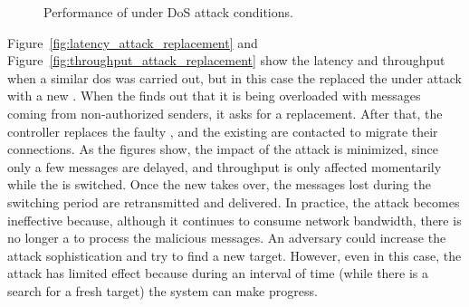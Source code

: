 \begin{figure}[h]
\hspace{-5mm}
\hspace{-5mm}
\caption{Performance of \sieveq under DoS attack conditions.}
\label{fig:performance_attacks}
\end{figure}


Figure~\ref{fig:latency_attack_replacement} and Figure~\ref{fig:throughput_attack_replacement} show the latency and throughput when a similar \gls{dos} was carried out, but in this case the \sieveq replaced the \presieve under attack with a new \presieve.
When the \presieve finds out that it is being overloaded with messages coming from non-authorized senders, it asks for a replacement.
After that, the controller replaces the faulty \presieve, and the existing \senders are contacted to migrate their connections.
As the figures show, the impact of the attack is minimized, since only a few messages are delayed, and throughput is only affected momentarily while the \presieve is switched.
Once the new \presieve takes over, the messages lost during the switching period are retransmitted and delivered.
In practice, the attack becomes ineffective because, although it continues to consume network bandwidth, there is no longer a \presieve to process the malicious messages.
An adversary could increase the attack sophistication and try to find a new \presieve target.
However, even in this case, the attack has limited effect because during an interval of time (while there is a search for a fresh target) the system can make progress.


